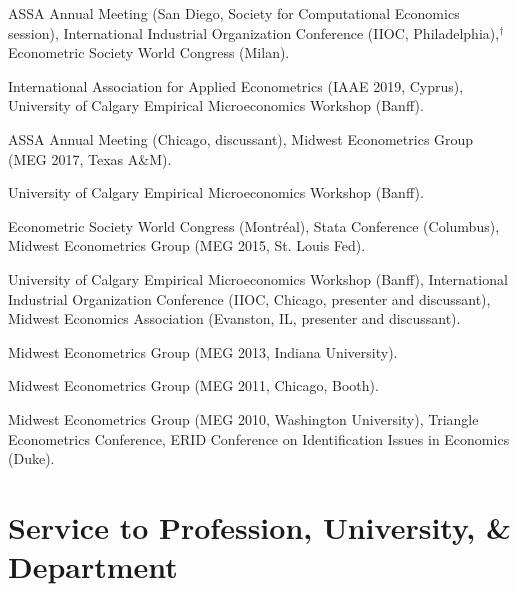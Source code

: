 \documentclass[10pt,letterpaper]{article}
\newcommand{\fncovid}{{\footnotesize ${}^{\dagger}$}}
\begin{document}
\begin{description}[font=\mdseries]
\item[2020]
  ASSA Annual Meeting (San Diego, Society for Computational Economics session),
  International Industrial Organization Conference (IIOC, Philadelphia),\fncovid
  Econometric Society World Congress (Milan).
\item[2019]
  International Association for Applied Econometrics (IAAE 2019, Cyprus),
  University of Calgary Empirical Microeconomics Workshop (Banff).
\item[2017]
  ASSA Annual Meeting (Chicago, discussant),
  Midwest Econometrics Group (MEG 2017, Texas A\&M).
\item[2016]
  University of Calgary Empirical Microeconomics Workshop (Banff).
\item[2015]
  Econometric Society World Congress (Montr\'{e}al),
  Stata Conference (Columbus),
  Midwest Econometrics Group (MEG 2015, St. Louis Fed).
\item[2014]
  University of Calgary Empirical Microeconomics Workshop (Banff),
  International Industrial Organization Conference (IIOC, Chicago, presenter and discussant),
  Midwest Economics Association (Evanston, IL, presenter and discussant).
\item[2013]
  Midwest Econometrics Group (MEG 2013, Indiana University).
\item[2011]
  Midwest Econometrics Group (MEG 2011, Chicago, Booth).
\item[2010]
  Midwest Econometrics Group (MEG 2010, Washington University),
  Triangle Econometrics Conference,
  ERID Conference on Identification Issues in Economics (Duke).
\end{description}

\section*{Service to Profession, University, \& Department}
\end{document}

